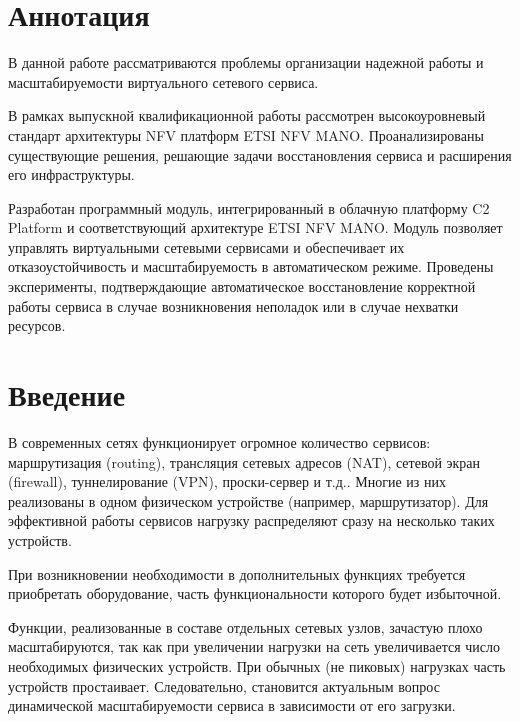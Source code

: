 \documentclass[oneside,final,14pt,a4paper]{extreport}
\begin{document}
\chapter*{Аннотация}
В данной работе рассматриваются проблемы организации надежной работы и масштабируемости виртуального сетевого сервиса.

В рамках выпускной квалификационной работы рассмотрен высокоуровневый стандарт архитектуры NFV платформ ETSI NFV MANO. Проанализированы существующие решения, решающие задачи восстановления сервиса и расширения его инфраструктуры.

Разработан программный модуль, интегрированный в облачную платформу C2 Platform и соответствующий архитектуре ETSI NFV MANO. Модуль позволяет управлять виртуальными сетевыми сервисами и обеспечивает их отказоустойчивость и масштабируемость в автоматическом режиме. Проведены эксперименты, подтверждающие автоматическое восстановление корректной работы сервиса в случае возникновения неполадок или в случае нехватки ресурсов.





\tableofcontents %





\chapter*{Введение}

В современных сетях функционирует огромное количество сервисов: маршрутизация (routing), трансляция сетевых адресов (NAT), сетевой экран (firewall), туннелирование (VPN), проски-сервер и т.д.. Многие из них реализованы в одном физическом устройстве (например, маршрутизатор). Для эффективной работы сервисов нагрузку распределяют сразу на несколько таких устройств. 

При возникновении необходимости в дополнительных функциях требуется приобретать оборудование, часть функциональности которого будет избыточной. 

Функции, реализованные в составе отдельных сетевых узлов, зачастую плохо масштабируются, так как при увеличении нагрузки на сеть увеличивается число необходимых физических устройств. При обычных (не пиковых) нагрузках часть устройств простаивает. Следовательно, становится актуальным вопрос динамической масштабируемости сервиса в зависимости от его загрузки.
\end{document}
